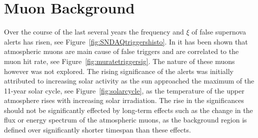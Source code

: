 \section{Muon Background}

Over the course of the last several years the frequency and $\xi$ of false supernova alerts has risen, see Figure~\ref{fig:SNDAQtriggershisto}. In \cite{vbaumaster} it has been shown that atmospheric muons are main cause of false triggers and are correlated to the muon hit rate, see Figure~\ref{fig:muratetriggersig}. The nature of these muons however was not explored. The rising significance of the alerts was initially attributed to increasing solar activity as the sun approached the maximum of the 11-year solar cycle, see Figure~\ref{fig:solarcycle}, as the temperature of the upper atmosphere rises with increasing solar irradiation. The rise in the significances should not be significantly effected by long-term effects such as the change in the flux or energy spectrum of the atmospheric muons, as the background region is defined over significantly shorter timespan than these effects.

